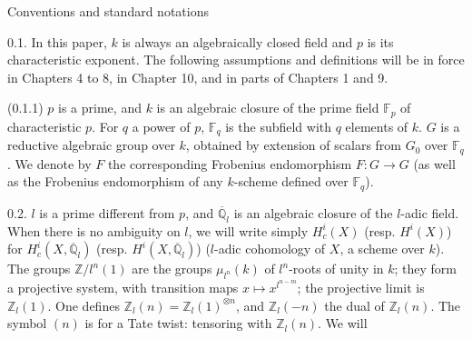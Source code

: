 \documentclass[9pt,twoside]{extarticle}
\begin{document}
{Conventions and standard notations\par

0.1. In this paper, \(k\) is always an algebraically closed field and \(p\) is its characteristic exponent. The following assumptions and definitions will be in force in Chapters 4 to 8, in Chapter 10, and in parts of Chapters 1 and 9.\par

(0.1.1) \(p\) is a prime, and \(k\) is an algebraic closure of the prime field \(\mathbb{F}_p\) of characteristic \(p\). For \(q\) a power of \(p\), \(\mathbb{F}_q\) is the subfield with \(q\) elements of \(k\). \(G\) is a reductive algebraic group over \(k\), obtained by extension of scalars from \(G_0\) over \(\mathbb{F}_q\). We denote by \(F\) the corresponding Frobenius endomorphism \(F:G\to G\) (as well as the Frobenius endomorphism of any \(k\)-scheme defined over \(\mathbb{F}_q\)).\par

0.2. \(l\) is a prime different from \(p\), and \(\overline{\mathbb{Q}}_l\) is an algebraic closure of the \(l\)-adic field. When there is no ambiguity on \(l\), we will write simply \(H_c^i(X)\) (resp. \(H^i(X)\)) for \(H_c^i(X,\overline{\mathbb{Q}}_l)\) (resp. \(H^i(X,\overline{\mathbb{Q}}_l)\)) (\(l\)-adic cohomology of \(X\), a scheme over \(k\)). The groups \(\mathbb{Z}/l^n(1)\) are the groups \(\mu_{l^n}(k)\) of \(l^n\)-roots of unity in \(k\); they form a projective system, with transition maps \(x\mapsto x^{l^{n-m}}\); the projective limit is \(\mathbb{Z}_l(1)\). One defines \(\mathbb{Z}_l(n)=\mathbb{Z}_l(1)^{\otimes n}\), and \(\mathbb{Z}_l(-n)\) the dual of \(\mathbb{Z}_l(n)\). The symbol \((n)\) is for a Tate twist: tensoring with \(\mathbb{Z}_l(n)\). We will\par
}
\end{document}
